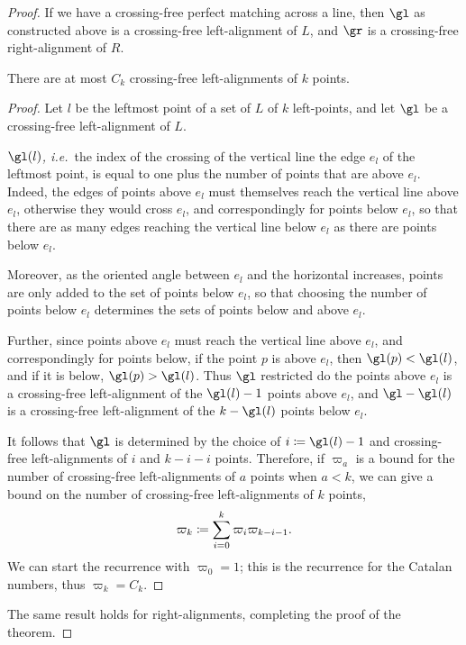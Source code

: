 \documentclass[10pt, a4paper, twoside]{basestyle}
\newcommand{\idest}{\emph{, i.e.\ }}
\begin{document}
\begin{theorem}
\begin{proof}
{}

If we have a crossing-free perfect matching across a line, then $\gl$ as constructed above is a crossing-free
left-alignment of $L$, and $\gr$ is a crossing-free right-alignment of $R$.

\begin{lemma}
There are at most $C_k$ crossing-free left-alignments of $k$ points.
\begin{proof}
Let $l$ be the leftmost point of a set of $L$ of $k$ left-points, and let $\gl$ be a crossing-free
left-alignment of $L$.

$\gl(l)$\idest the index of the crossing of the vertical line the edge $e_l$ of the leftmost point,
is equal to one plus the number of points that are above $e_l$. Indeed, the edges of points above $e_l$ must
themselves reach the vertical line above $e_l$, otherwise they would cross $e_l$, and correspondingly for
points below $e_l$, so that there are as many edges reaching the vertical line below $e_l$ as there are points
below $e_l$.

Moreover, as the oriented angle between $e_l$ and the horizontal increases, points are only added to the
set of points below $e_l$, so that choosing the number of points below $e_l$ determines the sets of points
below and above $e_l$.

Further, since points above $e_l$ must reach the vertical line above $e_l$, and correspondingly for points below,
if the point $p$ is above $e_l$, then $\gl(p) < \gl(l)$, and if it is below, $\gl(p) > \gl(l)$. Thus
$\gl$ restricted do the points above $e_l$ is a crossing-free left-alignment of the $\gl(l) - 1$ points above
$e_l$, and $\gl-\gl(l)$ is a crossing-free left-alignment of the $k - \gl(l)$ points below $e_l$.

It follows that $\gl$ is determined by the choice of $i \DefineAs \gl(l) - 1$ and crossing-free left-alignments
of $i$ and $k-i-i$ points. Therefore, if $\varpi_a$ is a bound for the number of crossing-free
left-alignments of $a$ points when $a < k$,
we can give a bound on the number of crossing-free left-alignments of $k$ points,
\[\varpi_k\DefineAs\sum{i=0}[k]\varpi_{i}\varpi_{k-i-1}\text.\]
We can start the recurrence with $\varpi_0 = 1$; this is the recurrence for the Catalan numbers, thus
$\varpi_k=C_k$.
\end{proof}
\end{lemma}
The same result holds for right-alignments, completing the proof of the theorem.
\end{proof}
\end{theorem}
\end{document}
